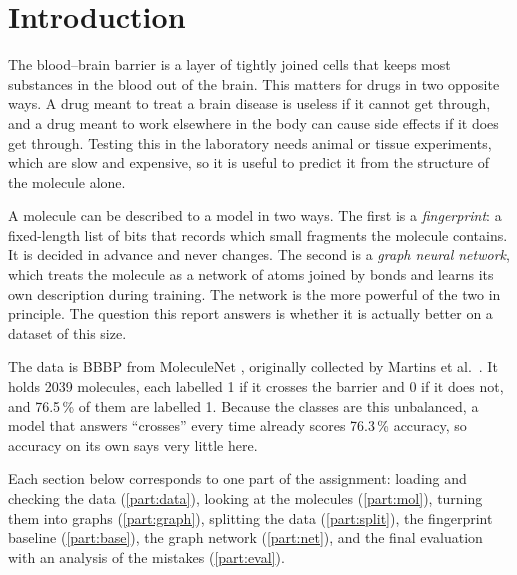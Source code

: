 \section*{Introduction}

The blood--brain barrier is a layer of tightly joined cells that keeps most substances in the blood out of the brain. This matters for drugs in two opposite ways. A drug meant to treat a brain disease is useless if it cannot get through, and a drug meant to work elsewhere in the body can cause side effects if it does get through. Testing this in the laboratory needs animal or tissue experiments, which are slow and expensive, so it is useful to predict it from the structure of the molecule alone.

A molecule can be described to a model in two ways. The first is a \emph{fingerprint}: a fixed-length list of bits that records which small fragments the molecule contains. It is decided in advance and never changes. The second is a \emph{graph neural network}, which treats the molecule as a network of atoms joined by bonds and learns its own description during training. The network is the more powerful of the two in principle. The question this report answers is whether it is actually better on a dataset of this size.

The data is BBBP from MoleculeNet \parencite{MoleculeNet}, originally collected by Martins et al.\ \parencite{Martins}. It holds 2039 molecules, each labelled 1 if it crosses the barrier and 0 if it does not, and 76.5\,\% of them are labelled 1. Because the classes are this unbalanced, a model that answers ``crosses'' every time already scores 76.3\,\% accuracy, so accuracy on its own says very little here.

Each section below corresponds to one part of the assignment: loading and checking the data (\ref{part:data}), looking at the molecules (\ref{part:mol}), turning them into graphs (\ref{part:graph}), splitting the data (\ref{part:split}), the fingerprint baseline (\ref{part:base}), the graph network (\ref{part:net}), and the final evaluation with an analysis of the mistakes (\ref{part:eval}).
